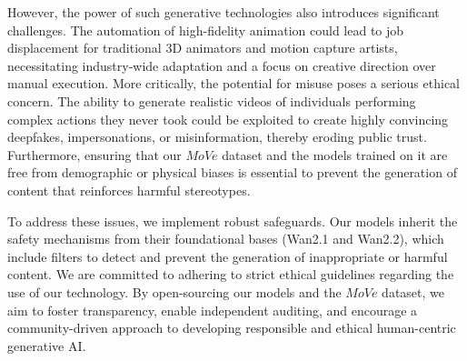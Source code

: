However, the power of such generative technologies also introduces significant challenges. The automation of high-fidelity animation could lead to job displacement for traditional 3D animators and motion capture artists, necessitating industry-wide adaptation and a focus on creative direction over manual execution. More critically, the potential for misuse poses a serious ethical concern. The ability to generate realistic videos of individuals performing complex actions they never took could be exploited to create highly convincing deepfakes, impersonations, or misinformation, thereby eroding public trust. Furthermore, ensuring that our $MoVe$ dataset and the models trained on it are free from demographic or physical biases is essential to prevent the generation of content that reinforces harmful stereotypes.

To address these issues, we implement robust safeguards. Our models inherit the safety mechanisms from their foundational bases (Wan2.1 and Wan2.2), which include filters to detect and prevent the generation of inappropriate or harmful content. We are committed to adhering to strict ethical guidelines regarding the use of our technology. By open-sourcing our models and the $MoVe$ dataset, we aim to foster transparency, enable independent auditing, and encourage a community-driven approach to developing responsible and ethical human-centric generative AI.

